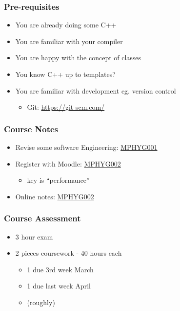 \subsubsection{Pre-requisites}\label{pre-requisites}

\begin{itemize}
\itemsep1pt\parskip0pt
\item
  You are already doing some C++
\item
  You are familiar with your compiler
\item
  You are happy with the concept of classes
\item
  You know C++ up to templates?
\item
  You are familiar with development eg. version control

  \begin{itemize}
  \itemsep1pt\parskip0pt
  \item
    Git: \url{https://git-scm.com/}
  \end{itemize}
\end{itemize}

\subsubsection{Course Notes}\label{course-notes}

\begin{itemize}
\itemsep1pt\parskip0pt
\item
  Revise some software Engineering:
  \href{http://github-pages.ucl.ac.uk/rsd-engineeringcourse/}{MPHYG001}
\item
  Register with Moodle: \href{https://moodle.ucl.ac.uk/}{MPHYG002}

  \begin{itemize}
  \itemsep1pt\parskip0pt
  \item
    key is ``performance''
  \end{itemize}
\item
  Online notes:
  \href{http://rits.github-pages.ucl.ac.uk/research-computing-with-cpp/}{MPHYG002}
\end{itemize}

\subsubsection{Course Assessment}\label{course-assessment}

\begin{itemize}
\itemsep1pt\parskip0pt
\item
  3 hour exam
\item
  2 pieces coursework - 40 hours each

  \begin{itemize}
  \itemsep1pt\parskip0pt
  \item
    1 due 3rd week March
  \item
    1 due last week April
  \item
    (roughly)
  \end{itemize}
\end{itemize}

